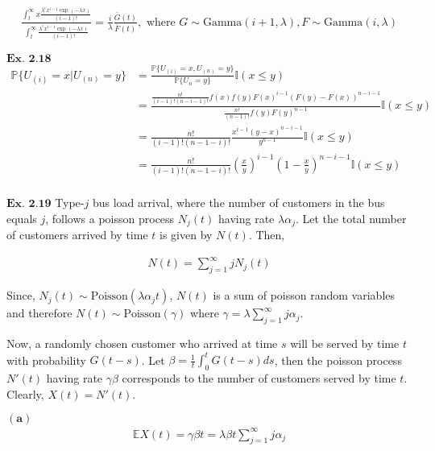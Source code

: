 \documentclass{article}
\begin{document}
\begin{align*}
\frac{\int_{t}^{\infty}x\frac{\lambda^ix^{i-1}\exp(-\lambda x)}{(i-1)!}}{\int_{t}^{\infty}\frac{\lambda^ix^{i-1}\exp(-\lambda x)}{(i-1)!}} = \frac{i}{\lambda}\frac{\bar{G}(t)}{\bar{F}(t)}, \text{ where } G \sim \text{Gamma}(i+1,\lambda), F \sim \text{Gamma}(i,\lambda)
\end{align*}

\vspace{0.2in}
${\textbf{Ex. 2.18}}$
\begin{align*}
\mathbb{P}\{U_{(i)}=x|U_{(n)}=y\} &= \frac{\mathbb{P}\{U_{(i)} = x, U_{(n)} = y\}}{\mathbb{P}\{U_{n}=y\}}\mathbb{I}(x\leq y)\\
&= \frac{\frac{n!}{(i-1)!(n-i-1)!}f(x)f(y)F(x)^{i-1}(F(y)-F(x))^{n-i-1}}{\frac{n!}{(n-1)!}f(y)F(y)^{n-1}}\mathbb{I}(x\leq y)\\
&= \frac{n!}{(i-1)!(n-1-i)!}\frac{x^{i-1}(y-x)^{n-i-1}}{y^{n-1}}\mathbb{I}(x\leq y)\\
&= \frac{n!}{(i-1)!(n-1-i)!}\left(\frac{x}{y}\right)^{i-1}\left(1-\frac{x}{y}\right)^{n-i-1}\mathbb{I}(x\leq y)\\
\end{align*}

\vspace{0.2in}
${\textbf{Ex. 2.19}}$
Type-$j$ bus load arrival, where the number of customers in the bus equals $j$, follows a poisson process $N_{j}(t)$ having rate $\lambda \alpha_j$. Let the total number of customers arrived by time $t$ is given by $N(t)$. Then,

\begin{align*}
N(t) = \sum_{j=1}^{\infty}jN_{j}(t)
\end{align*}

Since, $N_j(t)\sim \text{Poisson}(\lambda \alpha_jt)$, $N(t)$ is a sum of poisson random variables and therefore $N(t) \sim \text{Poisson}(\gamma)$ where $\gamma = \lambda\sum_{j=1}^{\infty}j\alpha_j$.

Now, a randomly chosen customer who arrived at time $s$ will be served by time $t$ with probability $G(t-s)$. Let $\beta = \frac{1}{t}\int_{0}^{t}G(t-s)ds$, then the poisson process $N'(t)$ having rate $\gamma \beta$ corresponds to the number of customers served by time $t$. Clearly, $X(t) = N'(t)$.

$\mathbf{(a)}$
\begin{align*}
\mathbb{E}X(t) = \gamma \beta t = \lambda\beta t\sum_{j=1}^{\infty}j\alpha_j
\end{align*}
\end{document}
